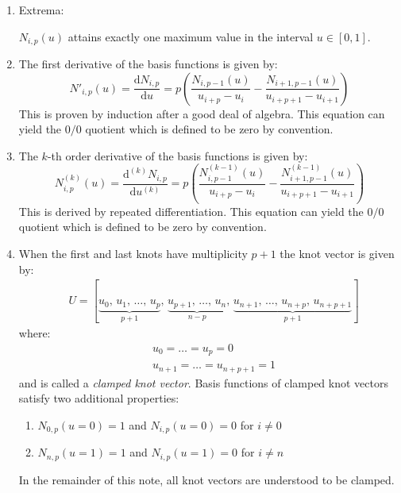 \begin{enumerate}
    \item Extrema:
    
    $N_{i,p}(u)$ attains exactly one maximum value in the interval $u \in [0, 1]$.
    
    \item The first derivative of the basis functions is given by:
        \begin{equation*}
            N'_{i,p}(u) = \frac{\mathrm{d}N_{i,p}}{\mathrm{d}u} =
            p \left( \frac{N_{i,p-1}(u)}{u_{i+p}-u_{i}} - \frac{N_{i+1,p-1}(u)}{u_{i+p+1}-u_{i+1}} \right)
        \end{equation*}
        This is proven by induction after a good deal of algebra.
        This equation can yield the $0/0$ quotient which is defined to be zero by convention.
        
    \item The $k$-th order derivative of the basis functions is given by:
        \begin{equation*}
            N^{(k)}_{i,p}(u) = \frac{\mathrm{d}^{(k)} N_{i,p}}{\mathrm{d}u^{(k)}} =
            p \left( \frac{N^{(k-1)}_{i,p-1}(u)}{u_{i+p}-u_{i}} - \frac{N^{(k-1)}_{i+1,p-1}(u)}{u_{i+p+1}-u_{i+1}} \right)
        \end{equation*}
        This is derived by repeated differentiation.
        This equation can yield the $0/0$ quotient which is defined to be zero by convention.

    \item When the first and last knots have multiplicity $p+1$ the knot vector is given by:
        \begin{align*}
            & U = [\underbrace{u_0,\, u_1,\, \dots,\, u_{p}}_{p+1},\, \underbrace{u_{p+1},\, \dots,\, u_{n}}_{n-p},\, \underbrace{u_{n+1},\, \dots,\, u_{n+p},\, u_{n+p+1}}_{p+1}]
        \end{align*}
        where:
        \begin{align*}
            & u_0 = \dots = u_p = 0 \\
            & u_{n+1} = \dots = u_{n+p+1} = 1
        \end{align*}
    and is called a \textit{clamped knot vector}. Basis functions of clamped knot vectors satisfy two additional properties:
    \begin{enumerate}
            \item $N_{0,p}(u=0) =1$ and $N_{i,p}(u=0)=0$ for $i\neq0$
            \item $N_{n,p}(u=1) =1$ and $N_{i,p}(u=1)=0$ for $i\neq n$
    \end{enumerate}
    In the remainder of this note, all knot vectors are understood to be clamped.
    

\end{enumerate}
